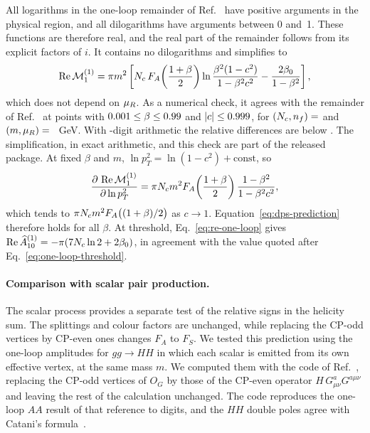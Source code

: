 All logarithms in the one-loop remainder
of Ref.~\cite{Bhattacharya:2019bmd} have
positive arguments in the physical region,
and all dilogarithms have arguments between
0 and~1. These functions are therefore real,
and the real part of the remainder follows
from its explicit factors of $i$. It
contains no dilogarithms and simplifies to
\begin{equation}
 \operatorname{Re}\mathcal M_1^{(1)}
 =\pi m^2\left[N_c\,F_A\!\left(\frac{1+\beta}{2}\right)
 \ln\frac{\beta^2(1-c^2)}{1-\beta^2c^2}
 -\frac{2\beta_0}{1-\beta^2}\right],
 \label{eq:re-one-loop}
\end{equation}
which does not depend on $\mu_R$.
As a numerical check, it agrees with the
remainder of Ref.~\cite{Bhattacharya:2019bmd} at
\ClosedFormPoints{} points with
$0.001\leq\beta\leq0.99$
and $|c|\leq0.999$, for
$(N_c,n_f)=$ \ClosedFormSets{} and
$(m,\mu_R)=$ \ClosedFormScales{}~GeV.
With \ClosedFormDigits-digit arithmetic
the relative differences are below
\ClosedFormDev{}. The simplification, in
exact arithmetic, and this check are part
of the released package.
At fixed $\beta$ and $m$,
$\ln p_T^2=\ln(1-c^2)+\text{const}$, so
\[
 \frac{\partial\,\operatorname{Re}\mathcal M_1^{(1)}}
      {\partial\ln p_T^2}
 =\pi N_c m^2F_A\!\left(\frac{1+\beta}{2}\right)
 \frac{1-\beta^2}{1-\beta^2c^2},
\]
which tends to
$\pi N_c m^2F_A\bigl((1+\beta)/2\bigr)$
as $c\to1$.
Equation~\eqref{eq:dps-prediction} therefore
holds for all $\beta$. At threshold,
Eq.~\eqref{eq:re-one-loop} gives
$\operatorname{Re}\widehat A^{(1)}_{10}=-\pi(7N_c\ln2+2\beta_0)$,
in agreement with the value quoted after
Eq.~\eqref{eq:one-loop-threshold}.


\paragraph{Comparison with scalar pair production.}

The scalar process provides a separate test
of the relative signs in the helicity sum.
The splittings and colour factors are
unchanged, while replacing the CP-odd
vertices by CP-even ones changes $F_A$
to $F_S$.
We tested this prediction using the one-loop amplitudes for $gg\to HH$ in which each scalar is emitted from its own effective vertex, at the same mass $m$. We computed them with the code of Ref.~\cite{Bhattacharya:2019bmd}, replacing the CP-odd vertices of $O_G$ by those of the CP-even operator $H\,G^a_{\mu\nu}G^{a\mu\nu}$ and leaving the rest of the calculation unchanged.
The code reproduces the one-loop $AA$
result of that reference to
\HHReproduceDigits{} digits, and the
$HH$ double poles agree with Catani's
formula~\cite{Catani:1998bh}.

